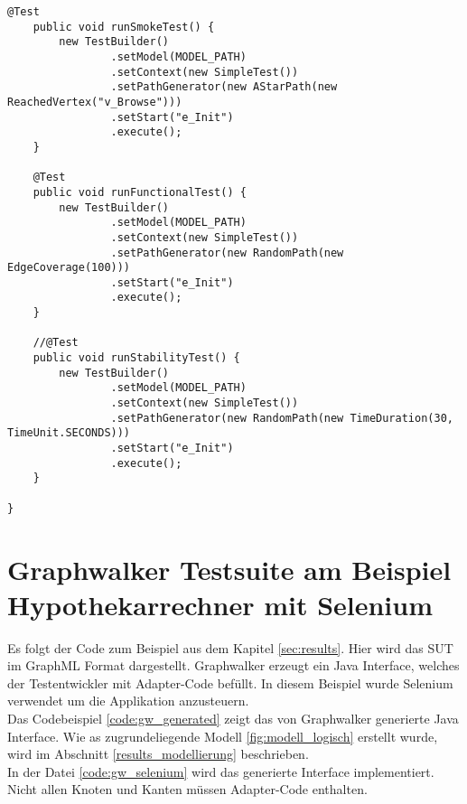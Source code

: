 \begin{lstlisting}[caption=SimpleTest.java, label=code:soap_graphwalker]
    @Test
    public void runSmokeTest() {
        new TestBuilder()
                .setModel(MODEL_PATH)
                .setContext(new SimpleTest())
                .setPathGenerator(new AStarPath(new ReachedVertex("v_Browse")))
                .setStart("e_Init")
                .execute();
    }

    @Test
    public void runFunctionalTest() {
        new TestBuilder()
                .setModel(MODEL_PATH)
                .setContext(new SimpleTest())
                .setPathGenerator(new RandomPath(new EdgeCoverage(100)))
                .setStart("e_Init")
                .execute();
    }

    //@Test
    public void runStabilityTest() {
        new TestBuilder()
                .setModel(MODEL_PATH)
                .setContext(new SimpleTest())
                .setPathGenerator(new RandomPath(new TimeDuration(30, TimeUnit.SECONDS)))
                .setStart("e_Init")
                .execute();
    }

}
\end{lstlisting}


\section{Graphwalker Testsuite am Beispiel Hypothekarrechner mit Selenium}
Es folgt der Code zum Beispiel aus dem Kapitel  \ref{sec:results}. Hier wird das \Gls{SUT} im GraphML Format dargestellt. Graphwalker erzeugt ein Java Interface, welches der Testentwickler mit Adapter-Code befüllt. In diesem Beispiel wurde Selenium verwendet um die Applikation anzusteuern.\\

Das Codebeispiel \ref{code:gw_generated} zeigt das von Graphwalker generierte Java Interface. Wie as zugrundeliegende Modell \ref{fig:modell_logisch} erstellt wurde, wird im Abschnitt \ref{results_modellierung} beschrieben.\\

In der Datei \ref{code:gw_selenium} wird das generierte Interface implementiert. Nicht allen Knoten und Kanten müssen Adapter-Code enthalten.\\

